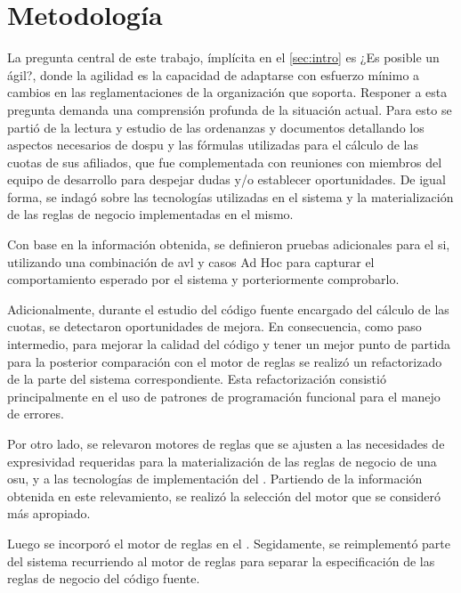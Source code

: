 \section{Metodología} \label{sec:metodologia}

La pregunta central de este trabajo, ímplícita en el \cref{sec:intro} es ¿Es posible un {\SIOSU} ágil?, donde la agilidad es la capacidad de adaptarse con esfuerzo mínimo a cambios en las reglamentaciones de la organización que soporta. Responer a esta pregunta demanda una comprensión profunda de la situación actual.
Para esto se partió de la lectura y estudio de las ordenanzas y documentos detallando los aspectos necesarios de \acrshort{dospu} y las fórmulas utilizadas para el cálculo de las cuotas de sus afiliados, que fue complementada con reuniones con miembros del equipo de desarrollo {\SIDOSPU} para despejar dudas y/o establecer oportunidades. De igual forma, se indagó sobre las tecnologías utilizadas en el sistema y la materialización de las reglas de negocio implementadas en el mismo.

Con base en la información obtenida, se definieron pruebas adicionales para el \acrshort{si}, utilizando una combinación de \acrfull{avl} y casos Ad Hoc para capturar el comportamiento esperado por el sistema y porteriormente comprobarlo.

Adicionalmente, durante el estudio del código fuente encargado del cálculo de las cuotas, se detectaron oportunidades de mejora. En consecuencia, como paso intermedio, para mejorar la calidad del código y tener un mejor punto de partida para la posterior comparación con el motor de reglas se realizó un refactorizado de la parte del sistema correspondiente. Esta refactorización consistió principalmente en el uso de patrones de programación funcional para el manejo de errores.

Por otro lado, se relevaron motores de reglas que se ajusten a las necesidades de expresividad requeridas para la materialización de las reglas de negocio de una \acrshort{osu}, y a las tecnologías de implementación del {\SIDOSPU}. Partiendo de la información obtenida en este relevamiento, se realizó la selección del motor que se consideró más apropiado.

Luego se incorporó el motor de reglas en el {\SIDOSPU}. Segidamente, se reimplementó parte del sistema recurriendo al motor de reglas para separar la especificación de las reglas de negocio del código fuente.

